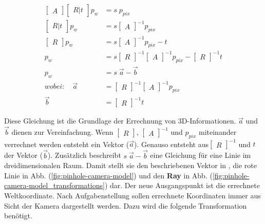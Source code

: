 	\begin{equation}
	\begin{aligned}
	\begin{bmatrix} A \end{bmatrix} \begin{bmatrix} R|t \end{bmatrix} p_w &= s \; p_{pix} \\
	\begin{bmatrix} R|t \end{bmatrix} p_w &= s \begin{bmatrix} A \end{bmatrix}^{-1} p_{pix} \\
	\begin{bmatrix} R \end{bmatrix} p_w &= s \begin{bmatrix} A \end{bmatrix}^{-1} p_{pix} - t \\
	p_w &= s \begin{bmatrix} R \end{bmatrix}^{-1} \begin{bmatrix} A \end{bmatrix}^{-1} p_{pix} - \begin{bmatrix} R \end{bmatrix}^{-1} t \\
	p_w &= s \; \vec{a} - \vec{b} \\
	wobei: \quad \vec{a} & = \begin{bmatrix} R \end{bmatrix}^{-1} \begin{bmatrix} A \end{bmatrix}^{-1} p_{pix} \\
	\vec{b} &= \begin{bmatrix} R \end{bmatrix}^{-1} t
	\end{aligned}
	\label{eq:pixel_zu_welt}
	\end{equation}
	
	Diese Gleichung ist die Grundlage der Errechnung von 3D-Informationen. \( \vec{a} \) und \( \vec{b} \) dienen zur Vereinfachung. Wenn \( \begin{bmatrix} R \end{bmatrix} \), \( \begin{bmatrix} A \end{bmatrix}^{-1} \) und \( p_{pix} \) miteinander verrechnet werden entsteht ein Vektor (\( \vec{a} \)). Genauso entsteht aus\( \begin{bmatrix} R \end{bmatrix}^{-1} \) und \( t \) der Vektor (\( \vec{b} \)). Zusätzlich beschreibt \( s \; \vec{a} - \vec{b} \) eine Gleichung für eine Linie im dreidimensionalen Raum. Damit stellt sie den beschriebenen Vektor in \citep[vgl.][S. 3]{dawson-howe_simple_1994}, die rote Linie in Abb. (\ref{fig:pinhole-camera-model}) und den \textbf{Ray} in Abb. (\ref{fig:pinhole-camera-model_transformations}) dar. \newline
	Der neue Ausgangspunkt ist die errechnete Weltkoordinate. Nach Aufgabenstellung sollen errechnete Koordinaten immer aus Sicht der Kamera dargestellt werden. Dazu wird die folgende Transformation benötigt. 
	
